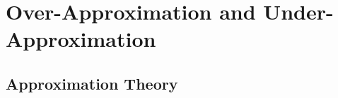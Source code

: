 \chapter{Over-Approximation and Under-Approximation}\label{chap:OT-UT}
\section{Approximation Theory}
\begin{comment}
$F = \exists x_1 \in I_1 \cdots x_n \in I_n. \bigwedge \limits_j \psi_j(x_1,\cdots,x_n)$, 
where $\psi_j(x_1,\cdots,x_n)$ is an atomic formula. 
%
$F$ is equivalnet to 
$\exists x_1 \ldots x_n. (\bigwedge \limits_i x_i \in I_i) \wedge (\bigwedge \limits_j \psi_j(x_1,\cdots,x_n))$, 
and we call $\bigwedge \limits_i x_i \in I_i$ {\em interval constraints}, and 
we refer $\bigwedge \limits_j \psi_j(x_1,\cdots,x_n)$ by $\psi(x_1,\cdots,x_n)$. 
Initially, interval constraints have a form of the conjunction $\bigwedge \limits_i x_i \in I_i$, 
and later by refinement, $x_i \in I_i$ is decomposed into a clause $\bigvee_j x_i \in I_{i_j}$, 
which makes a CNF. 

As an SMT (SAT modulo theory) problem, 
boolean variables are assigned to each $x_i \in I_{i_j}$, 
and truth assignments is produced by a SAT solver, 
which are proved or disproved by a background theory $T$ whether it satisfies $\psi(x_1,\cdots,x_n)$. 

As notational convention, $m$ (the lower case) denotes 
a variable assignments on $x_i$'s, and 
$M$ (the upper case) denotes a truth assignment on $x_i \in I_{i_j}$'s. 
We write $m \in M$ when an instance $m = \{ x_i \leftarrow c_i \}$ satisfies 
all $c_i \in I_{i_j}$ that are assigned true by $M$. 

We assume {\em very lazy theory learning}~\cite{dpll}, and 
a backend theory $T$ is applied only for a full truth assignment $M$. 
\begin{itemize}
\item If an instance $m$ satisfies $\psi(x_1,\cdots,x_n)$, we denote $m \models_T \psi(x_1,\cdots,x_n)$. 
\item If each instance $m$ with $m \in M$ satisfies $\psi(x_1,\cdots,x_n)$, 
we denote $M \models_T \psi(x_1,\cdots,x_n)$. 
\end{itemize}
\end{comment}

